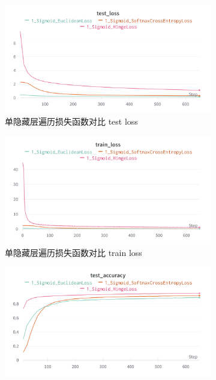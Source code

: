 \documentclass{article}
\begin{document}
\begin{figure}[htbp]
	\centering
	\begin{subfigure}{0.475\textwidth}
		\centering
		\includegraphics[width=1\textwidth]{../pics/单层损失函数test_loss.png}
		\caption{单隐藏层遍历损失函数对比 test loss}
	\end{subfigure}
	\begin{subfigure}{0.475\textwidth}
		\centering
		\includegraphics[width=1\textwidth]{../pics/单层损失函数train_loss.png}
		\caption{单隐藏层遍历损失函数对比 train loss}
	\end{subfigure}
	\begin{subfigure}{0.475\textwidth}
		\centering
		\includegraphics[width=1\textwidth]{../pics/单层损失函数test_acc.png}

\end{subfigure}
\end{figure}
\end{document}
